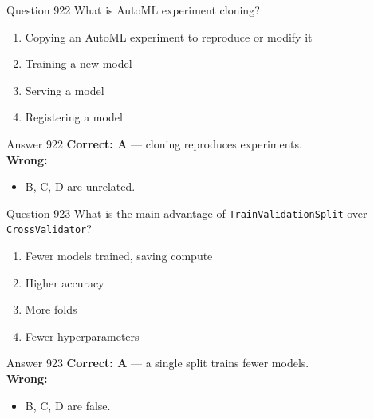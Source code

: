 \documentclass[aspectratio=169,11pt]{beamer}
\begin{document}
	\begin{frame}{Question 922}
		What is AutoML experiment cloning?
		\begin{enumerate}[label=\Alph*.]
			\item Copying an AutoML experiment to reproduce or modify it
			\item Training a new model
			\item Serving a model
			\item Registering a model
		\end{enumerate}
	\end{frame}
	\begin{frame}{Answer 922}
		\textbf{Correct: A} --- cloning reproduces experiments.\\
		\vspace{0.5em}
		\textbf{Wrong:}
		\begin{itemize}
			\item B, C, D are unrelated.
		\end{itemize}
	\end{frame}
	
	\begin{frame}{Question 923}
		What is the main advantage of \texttt{TrainValidationSplit} over \texttt{CrossValidator}?
		\begin{enumerate}[label=\Alph*.]
			\item Fewer models trained, saving compute
			\item Higher accuracy
			\item More folds
			\item Fewer hyperparameters
		\end{enumerate}
	\end{frame}
	\begin{frame}{Answer 923}
		\textbf{Correct: A} --- a single split trains fewer models.\\
		\vspace{0.5em}
		\textbf{Wrong:}
		\begin{itemize}
			\item B, C, D are false.
		\end{itemize}
	\end{frame}
	
\end{document}
